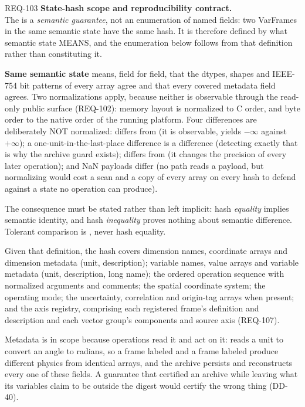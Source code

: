 \begin{reqbox}{REQ-103}{\stable}
\textbf{State-hash scope and reproducibility contract.}\\
The  is a \emph{semantic guarantee}, not an
enumeration of named fields: two VarFrames in the same semantic state
have the same hash. It is therefore defined by what semantic state
MEANS, and the enumeration below follows from that definition rather
than constituting it.

\textbf{Same semantic state} means, field for field, that the dtypes,
shapes and IEEE-754 bit patterns of every array agree and that every
covered metadata field agrees. Two normalizations apply, because
neither is observable through the read-only public surface (REQ-102):
memory layout is normalized to C order, and byte order to the native
order of the running platform. Four differences are deliberately NOT
normalized:  differs from  (it is observable,
 yields $-\infty$ against $+\infty$); a one-unit-in-the-last-place
difference is a difference (detecting exactly that is why the archive
guard exists);  differs from  (it changes
the precision of every later operation); and NaN payloads differ (no
path reads a payload, but normalizing would cost a scan and a copy of
every array on every hash to defend against a state no operation can
produce).

The consequence must be stated rather than left implicit: hash
\emph{equality} implies semantic identity, and hash \emph{inequality}
proves nothing about semantic difference. Tolerant comparison is
, never hash equality.

Given that definition, the hash covers dimension names, coordinate
arrays and dimension metadata (unit, description); variable names,
value arrays and variable metadata (unit, description, long name); the
ordered operation sequence with normalized arguments and comments; the
spatial coordinate system; the operating mode; the uncertainty,
correlation and origin-tag arrays when present; and the axis registry,
comprising each registered frame's definition and description and each
vector group's components and source axis (REQ-107).

Metadata is in scope because operations read it and act on it:
 reads a unit to convert an angle to radians, so a frame
labeled  and a frame labeled  produce different
physics from identical arrays, and the archive persists and
reconstructs every one of these fields. A guarantee that certified an
archive while leaving what its variables claim to be outside the digest
would certify the wrong thing (DD-40).


\end{reqbox}
